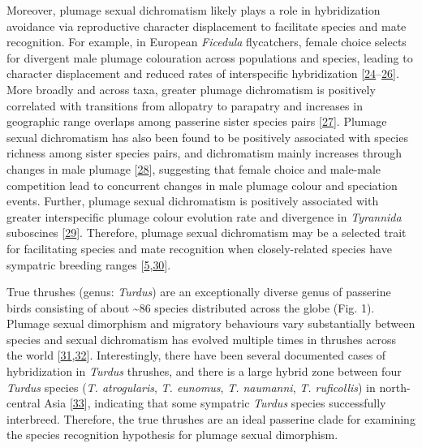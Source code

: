 \documentclass[
  a4paper,
]{article}
\begin{document}
Moreover, plumage sexual dichromatism likely plays a role in
hybridization avoidance via reproductive character displacement to
facilitate species and mate recognition. For example, in European
\emph{Ficedula} flycatchers, female choice selects for divergent male
plumage colouration across populations and species, leading to character
displacement and reduced rates of interspecific hybridization
{[}\protect\hyperlink{ref-alatalo1994}{24}--\protect\hyperlink{ref-laaksonen2015}{26}{]}.
More broadly and across taxa, greater plumage dichromatism is positively
correlated with transitions from allopatry to parapatry and increases in
geographic range overlaps among passerine sister species pairs
{[}\protect\hyperlink{ref-cooney2017}{27}{]}. Plumage sexual
dichromatism has also been found to be positively associated with
species richness among sister species pairs, and dichromatism mainly
increases through changes in male plumage
{[}\protect\hyperlink{ref-seddon2013}{28}{]}, suggesting that female
choice and male-male competition lead to concurrent changes in male
plumage colour and speciation events. Further, plumage sexual
dichromatism is positively associated with greater interspecific plumage
colour evolution rate and divergence in \emph{Tyrannida} suboscines
{[}\protect\hyperlink{ref-cooney2019}{29}{]}. Therefore, plumage sexual
dichromatism may be a selected trait for facilitating species and mate
recognition when closely-related species have sympatric breeding ranges
{[}\protect\hyperlink{ref-martin2015a}{5},\protect\hyperlink{ref-martin2010}{30}{]}.

True thrushes (genus: \emph{Turdus}) are an exceptionally diverse genus
of passerine birds consisting of about \textasciitilde86 species
distributed across the globe (Fig. 1). Plumage sexual dimorphism and
migratory behaviours vary substantially between species and sexual
dichromatism has evolved multiple times in thrushes across the world
{[}\protect\hyperlink{ref-clement2000}{31},\protect\hyperlink{ref-nagy2019}{32}{]}.
Interestingly, there have been several documented cases of hybridization
in \emph{Turdus} thrushes, and there is a large hybrid zone between four
\emph{Turdus} species (\emph{T. atrogularis}, \emph{T. eunomus},
\emph{T. naumanni}, \emph{T. ruficollis}) in north-central Asia
{[}\protect\hyperlink{ref-mccarthy2006}{33}{]}, indicating that some
sympatric \emph{Turdus} species successfully interbreed. Therefore, the
true thrushes are an ideal passerine clade for examining the species
recognition hypothesis for plumage sexual dimorphism.
\end{document}
